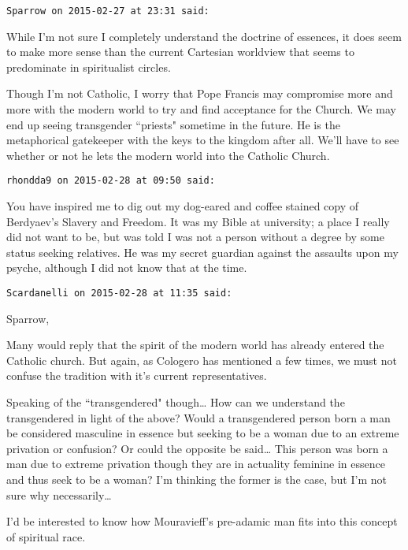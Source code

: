 \begin{footnotesize}\begin{sffamily}



\texttt{Sparrow on 2015-02-27 at 23:31 said: }

While I'm not sure I completely understand the doctrine of essences, it does seem to make more sense than the current Cartesian worldview that seems to predominate in spiritualist circles. 

Though I'm not Catholic, I worry that Pope Francis may compromise more and more with the modern world to try and find acceptance for the Church. We may end up seeing transgender ``priests" sometime in the future. He is the metaphorical gatekeeper with the keys to the kingdom after all. We'll have to see whether or not he lets the modern world into the Catholic Church.


\hfill

\texttt{rhondda9 on 2015-02-28 at 09:50 said: }

You have inspired me to dig out my dog-eared and coffee stained copy of Berdyaev's Slavery and Freedom. It was my Bible at university; a place I really did not want to be, but was told I was not a person without a degree by some status seeking relatives. He was my secret guardian against the assaults upon my psyche, although I did not know that at the time.


\hfill

\texttt{Scardanelli on 2015-02-28 at 11:35 said: }

Sparrow,

Many would reply that the spirit of the modern world has already entered the Catholic church. But again, as Cologero has mentioned a few times, we must not confuse the tradition with it's current representatives.

Speaking of the ``transgendered" though… How can we understand the transgendered in light of the above? Would a transgendered person born a man be considered masculine in essence but seeking to be a woman due to an extreme privation or confusion? Or could the opposite be said… This person was born a man due to extreme privation though they are in actuality feminine in essence and thus seek to be a woman? I'm thinking the former is the case, but I'm not sure why necessarily…

I'd be interested to know how Mouravieff's pre-adamic man fits into this concept of spiritual race.


\hfill


\end{sffamily}
\end{footnotesize}
